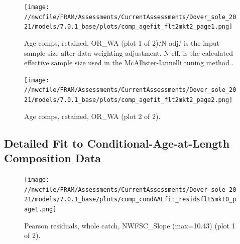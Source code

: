 \documentclass[11pt,
  english,
  a4paper,
]{article}
\begin{document}
\tagmcend\tagstructend


\begin{figure}
\centering
\texttt{[image: //nwcfile/FRAM/Assessments/CurrentAssessments/Dover\_sole\_2021/models/7.0.1\_base/plots/comp\_agefit\_flt2mkt2\_page1.png]}
\caption{Age comps, retained, OR\_WA (plot 1 of 2).`N adj.' is the input sample size after data-weighting adjustment. N eff. is the calculated effective sample size used in the McAllister-Iannelli tuning method..\label{fig:comp_agefit_flt2mkt2_page1}}
\end{figure}

\tagmcend\tagstructend


\begin{figure}
\centering
\texttt{[image: //nwcfile/FRAM/Assessments/CurrentAssessments/Dover\_sole\_2021/models/7.0.1\_base/plots/comp\_agefit\_flt2mkt2\_page2.png]}
\caption{Age comps, retained, OR\_WA (plot 2 of 2).\label{fig:comp_agefit_flt2mkt2_page2}}
\end{figure}

\tagmcend\tagstructend

\clearpage


\hypertarget{detailed-caal}{%
\subsection{Detailed Fit to Conditional-Age-at-Length Composition Data}\label{detailed-caal}}

\leavevmode\tagmcend\tagstructend


\begin{figure}
\centering
\texttt{[image: //nwcfile/FRAM/Assessments/CurrentAssessments/Dover\_sole\_2021/models/7.0.1\_base/plots/comp\_condAALfit\_residsflt5mkt0\_page1.png]}
\caption{Pearson residuals, whole catch, NWFSC\_Slope (max=10.43) (plot 1 of 2).\label{fig:comp_condAALfit_residsflt5mkt0_page1}}
\end{figure}
\end{document}
